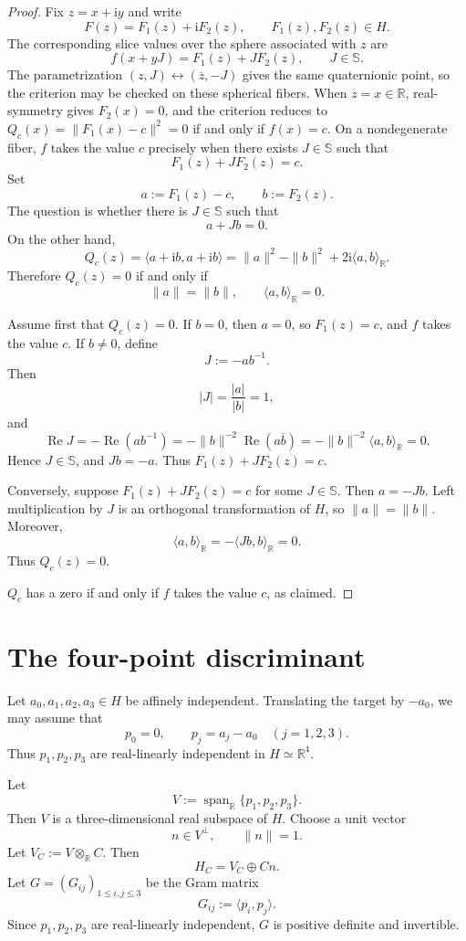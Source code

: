 \documentclass[11pt]{amsart}
\def\HH{H}%
\def\HHc{H_C}%
\def\CC{C}%
\numberwithin{equation}{section}
\theoremstyle{definition}
\theoremstyle{remark}
\newcommand{\HH}{\mathbb H}
\newcommand{\CC}{\mathbb C}
\newcommand{\RR}{\mathbb R}
\newcommand{\HHc}{\mathbb H_{\mathbb C}}
\newcommand{\Scal}{\mathbb S}
\begin{document}
\begin{proof}
Fix $z=x+\mathrm i y$ and write
\[
F(z)=F_1(z)+\mathrm iF_2(z),\qquad F_1(z),F_2(z)\in\HH.
\]
The corresponding slice values over the sphere associated with $z$ are
\[
f(x+yJ)=F_1(z)+JF_2(z),\qquad J\in\Scal.
\]
The parametrization $(z,J)\leftrightarrow(\overline z,-J)$ gives the same quaternionic point, so the criterion may be checked on these spherical fibers.  When $z=x\in\RR$, real-symmetry gives $F_2(x)=0$, and the criterion reduces to $Q_c(x)=\|F_1(x)-c\|^2=0$ if and only if $f(x)=c$.  On a nondegenerate fiber, $f$ takes the value $c$ precisely when there exists $J\in\Scal$ such that
\[
F_1(z)+JF_2(z)=c.
\]
Set
\[
a:=F_1(z)-c,\qquad b:=F_2(z).
\]
The question is whether there is $J\in\Scal$ such that
\[
a+Jb=0.
\]
On the other hand,
\[
Q_c(z)=\langle a+\mathrm i b,a+\mathrm i b\rangle
=\|a\|^2-\|b\|^2+2\mathrm i\langle a,b\rangle_{\RR}.
\]
Therefore $Q_c(z)=0$ if and only if
\[
\|a\|=\|b\|,\qquad \langle a,b\rangle_{\RR}=0.
\]

Assume first that $Q_c(z)=0$. If $b=0$, then $a=0$, so $F_1(z)=c$, and $f$ takes the value $c$. If $b\neq0$, define
\[
J:=-ab^{-1}.
\]
Then
\[
|J|=\frac{|a|}{|b|}=1,
\]
and
\[
\operatorname{Re}J=-\operatorname{Re}(ab^{-1})=-\|b\|^{-2}\operatorname{Re}(a\overline b)=-\|b\|^{-2}\langle a,b\rangle_{\RR}=0.
\]
Hence $J\in\Scal$, and $Jb=-a$. Thus $F_1(z)+JF_2(z)=c$.

Conversely, suppose $F_1(z)+JF_2(z)=c$ for some $J\in\Scal$. Then $a=-Jb$. Left multiplication by $J$ is an orthogonal transformation of $\HH$, so $\|a\|=\|b\|$. Moreover,
\[
\langle a,b\rangle_{\RR}=-\langle Jb,b\rangle_{\RR}=0.
\]
Thus $Q_c(z)=0$.

$Q_c$ has a zero if and only if $f$ takes the value $c$, as claimed.
\end{proof}

\section{The four-point discriminant}
\label{sec:discriminant}

Let $a_0,a_1,a_2,a_3\in\HH$ be affinely independent. Translating the target by $-a_0$, we may assume that
\[
p_0=0,\qquad p_j=a_j-a_0\quad (j=1,2,3).
\]
Thus $p_1,p_2,p_3$ are real-linearly independent in $\HH\simeq\RR^4$.

Let
\[
V:=\operatorname{span}_{\RR}\{p_1,p_2,p_3\}.
\]
Then $V$ is a three-dimensional real subspace of $\HH$.  Choose a unit vector
\[
n\in V^\perp,\qquad \|n\|=1.
\]
Let $V_{\CC}:=V\otimes_{\RR}\CC$.  Then
\[
\HHc=V_{\CC}\oplus\CC n.
\]
Let $G=(G_{ij})_{1\le i,j\le3}$ be the Gram matrix
\[
G_{ij}:=\langle p_i,p_j\rangle.
\]
Since $p_1,p_2,p_3$ are real-linearly independent, $G$ is positive definite and invertible.
\end{document}

